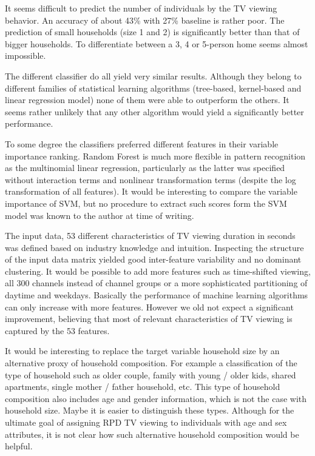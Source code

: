 \documentclass[]{article}
\begin{document}
It seems difficult to predict the number of individuals by the TV
viewing behavior. An accuracy of about 43\% with 27\% baseline is rather
poor. The prediction of small households (size 1 and 2) is significantly
better than that of bigger households. To differentiate between a 3, 4
or 5-person home seems almost impossible.

The different classifier do all yield very similar results. Although
they belong to different families of statistical learning algorithms
(tree-based, kernel-based and linear regression model) none of them were
able to outperform the others. It seems rather unlikely that any other
algorithm would yield a significantly better performance.

To some degree the classifiers preferred different features in their
variable importance ranking. Random Forest is much more flexible in
pattern recognition as the multinomial linear regression, particularly
as the latter was specified without interaction terms and nonlinear
transformation terms (despite the log transformation of all features).
It would be interesting to compare the variable importance of SVM, but
no procedure to extract such scores form the SVM model was known to the
author at time of writing.

The input data, 53 different characteristics of TV viewing duration in
seconds was defined based on industry knowledge and intuition.
Inspecting the structure of the input data matrix yielded good
inter-feature variability and no dominant clustering. It would be
possible to add more features such as time-shifted viewing, all 300
channels instead of channel groups or a more sophisticated partitioning
of daytime and weekdays. Basically the performance of machine learning
algorithms can only increase with more features. However we old not
expect a significant improvement, believing that most of relevant
characteristics of TV viewing is captured by the 53 features.

It would be interesting to replace the target variable household size by
an alternative proxy of household composition. For example a
classification of the type of household such as older couple, family
with young / older kids, shared apartments, single mother / father
household, etc. This type of household composition also includes age and
gender information, which is not the case with household size. Maybe it
is easier to distinguish these types. Although for the ultimate goal of
assigning RPD TV viewing to individuals with age and sex attributes, it
is not clear how such alternative household composition would be
helpful.
\end{document}
